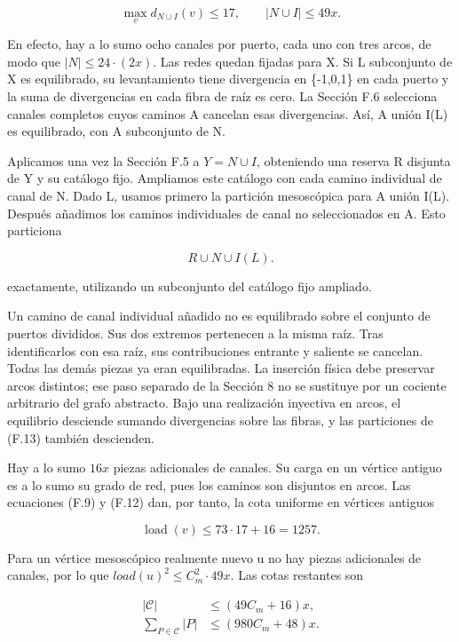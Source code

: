 \documentclass[spanish,11pt,a4paper]{article}
\begin{document}
\[\max_v d_{N\cup I}(v)\le17,\qquad |N\cup I|\le49x.\tag{F.12}\]

En efecto, hay a lo sumo ocho canales por puerto, cada uno con tres arcos, de modo que \(|N|\le 24\cdot (2x)\). Las redes quedan fijadas para X. Si L subconjunto de X es equilibrado, su levantamiento tiene divergencia en \{-1,0,1\} en cada puerto y la suma de divergencias en cada fibra de raíz es cero. La Sección F.6 selecciona canales completos cuyos caminos A cancelan esas divergencias. Así, A unión I(L) es equilibrado, con A subconjunto de N.

Aplicamos una vez la Sección F.5 a \(Y=N\cup I\), obteniendo una reserva R disjunta de Y y su catálogo fijo. Ampliamos este catálogo con cada camino individual de canal de N. Dado L, usamos primero la partición mesoscópica para A unión I(L). Después añadimos los caminos individuales de canal no seleccionados en A. Esto particiona

\[R\cup N\cup I(L).\tag{F.13}\]

exactamente, utilizando un subconjunto del catálogo fijo ampliado.

Un camino de canal individual añadido no es equilibrado sobre el conjunto de puertos divididos. Sus dos extremos pertenecen a la misma raíz. Tras identificarlos con esa raíz, sus contribuciones entrante y saliente se cancelan. Todas las demás piezas ya eran equilibradas. La inserción física debe preservar arcos distintos; ese paso separado de la Sección 8 no se sustituye por un cociente arbitrario del grafo abstracto. Bajo una realización inyectiva en arcos, el equilibrio desciende sumando divergencias sobre las fibras, y las particiones de (F.13) también descienden.

Hay a lo sumo \(16x\) piezas adicionales de canales. Su carga en un vértice antiguo es a lo sumo su grado de red, pues los caminos son disjuntos en arcos. Las ecuaciones (F.9) y (F.12) dan, por tanto, la cota uniforme en vértices antiguos

\[\operatorname{load}(v)\le73\cdot17+16=1257.\tag{F.14}\]

Para un vértice mesoscópico realmente nuevo u no hay piezas adicionales de canales, por lo que \(load(u)^{2}\le C_{m}^{2}\cdot 49x\). Las cotas restantes son

\[\begin{aligned}|\mathcal C|&\le(49C_m+16)x,\\\sum_{P\in\mathcal C}|P|&\le(980C_m+48)x.\end{aligned}\tag{F.15}\]
\end{document}
